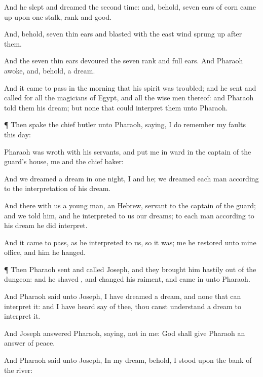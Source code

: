 {And he
slept and
dreamed the second
time: and, behold,
seven ears of
corn came
up upon
one
stalk,
rank and
good.

And, behold,
seven
thin
ears and
blasted with the east
wind sprung
up after
them.

And the seven
thin
ears
devoured the
seven
rank and
full
ears. And
Pharaoh
awoke, and, behold,
{} a
dream.

And it came to pass in the
morning that his
spirit was
troubled; and he
sent and
called for all the
magicians of
Egypt, and all the wise
men thereof: and
Pharaoh
told them his
dream; but
{} none that could
interpret them unto
Pharaoh.


\par }{\PP {}¶ Then
spake the
chief
butler unto
Pharaoh,
saying, I do
remember my
faults this
day:

Pharaoh was
wroth with his
servants, and
put me in
ward in the
captain of the
guard’s
house,
{} me and the
chief
baker:

And we
dreamed a
dream in
one
night, I and he; we
dreamed each
man according to the
interpretation of his
dream.

And
{} there with us a young
man, an
Hebrew,
servant to the
captain of the
guard; and we
told him, and he
interpreted to us our
dreams; to each
man according to his
dream he did
interpret.

And it came to pass, as he
interpreted to us, so it was; me he
restored unto mine
office, and him he
hanged.


\par }{\PP {}¶ Then
Pharaoh
sent and
called
Joseph, and they brought him
hastily out of the
dungeon: and he
shaved
{}, and
changed his
raiment, and came
in unto
Pharaoh.

And
Pharaoh
said unto
Joseph, I have
dreamed a
dream, and
{} none that can
interpret it: and I have
heard
say of thee,
{} thou canst
understand a
dream to
interpret it.

And
Joseph
answered
Pharaoh,
saying,
{} not in
me:
God shall
give
Pharaoh an
answer of
peace.


\par }{\PP {}And
Pharaoh
said unto
Joseph, In my
dream, behold, I
stood upon the
bank of the
river:

}
